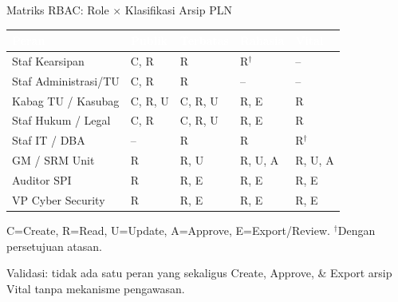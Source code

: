 \documentclass[aspectratio=169,11pt]{beamer}
\begin{document}
\begin{frame}{Matriks RBAC: Role $\times$ Klasifikasi Arsip PLN}
    \vspace{0.1cm}
    \centering
    \scriptsize
    \begin{tabularx}{\textwidth}{@{} >{\raggedright\arraybackslash}p{2.6cm} >{\centering\arraybackslash}p{1.8cm} >{\centering\arraybackslash}p{1.8cm} >{\centering\arraybackslash}p{1.8cm} >{\centering\arraybackslash}p{1.8cm} @{}}
        \toprule
        \rowcolor{rowhead}
        \textcolor{white}{\textbf{Peran}} & \textcolor{white}{\textbf{Publik}} & \textcolor{white}{\textbf{Terbatas}} & \textcolor{white}{\textbf{Rahasia}} & \textcolor{white}{\textbf{Vital}} \\
        \midrule
        \rowcolor{rowalt}
        Staf Kearsipan & C, R & R & R$^{\dagger}$ & -- \\
        Staf Administrasi/TU & C, R & R & -- & -- \\
        \rowcolor{rowalt}
        Kabag TU / Kasubag & C, R, U & C, R, U & R, E & R \\
        Staf Hukum / Legal & C, R & C, R, U & R, E & R \\
        \rowcolor{rowalt}
        Staf IT / DBA & -- & R & R & R$^{\dagger}$ \\
        GM / SRM Unit & R & R, U & R, U, A & R, U, A \\
        \rowcolor{rowalt}
        Auditor SPI & R & R, E & R, E & R, E \\
        VP Cyber Security & R & R, E & R, E & R, E \\
        \bottomrule
    \end{tabularx}
    
    \vspace{0.1cm}
    {\tiny C=Create, R=Read, U=Update, A=Approve, E=Export/Review. $^{\dagger}$Dengan persetujuan atasan.}
    
    \vspace{0.1cm}
    \begin{greenbox}
        \scriptsize Validasi: tidak ada satu peran yang sekaligus Create, Approve, \& Export arsip Vital tanpa mekanisme pengawasan.
    \end{greenbox}
\end{frame}
\end{document}

